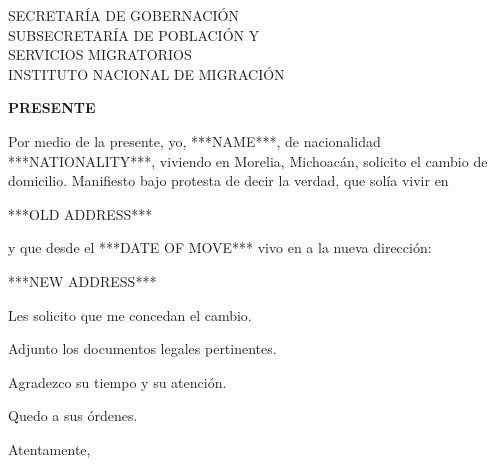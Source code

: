\documentclass[10pt]{letter}
\date{México ***DAY*** de ***MONTH*** del ***YEAR***}
\begin{document}
\begin{letter}{SECRETARÍA DE GOBERNACIÓN\\SUBSECRETARÍA DE POBLACIÓN Y\\SERVICIOS MIGRATORIOS\\INSTITUTO NACIONAL DE MIGRACIÓN}

\opening{\textbf{PRESENTE}}

Por medio de la presente, yo, ***NAME***, de nacionalidad ***NATIONALITY***, viviendo en Morelia, Michoacán, solicito el cambio de domicilio.  Manifiesto bajo protesta de decir la verdad, que solía vivir en

***OLD ADDRESS***

y que desde el ***DATE OF MOVE*** vivo en a la nueva dirección:

***NEW ADDRESS***

Les solicito que me concedan el cambio.

Adjunto los documentos legales pertinentes.

Agradezco su tiempo y su atención.

Quedo a sus órdenes.

\vspace{2\parskip}
\closing{Atentamente,}
\vspace{2\parskip}

\end{letter}
 
\end{document}
